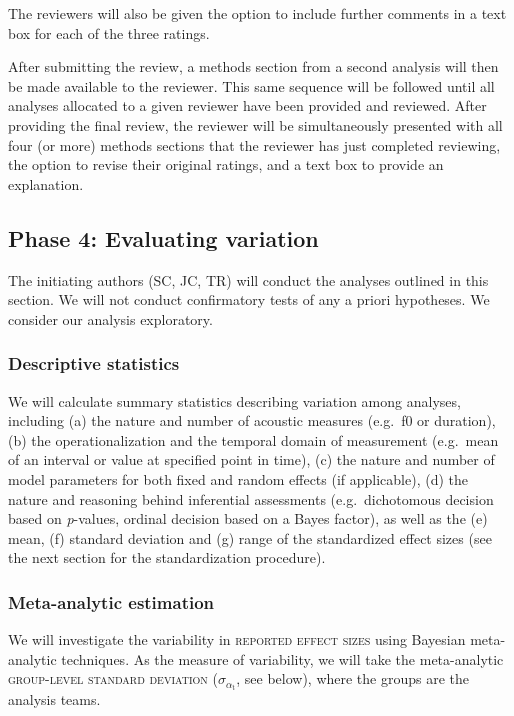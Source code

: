 \documentclass[Review,times,sageh]{sagej}
\begin{document}
The reviewers will also be given the option to include further comments in a text box for each of the three ratings.

After submitting the review, a methods section from a second analysis will then be made available to the reviewer.
This same sequence will be followed until all analyses allocated to a given reviewer have been provided and reviewed.
After providing the final review, the reviewer will be simultaneously presented with all four (or more) methods sections that the reviewer has just completed reviewing, the option to revise their original ratings, and a text box to provide an explanation.

\hypertarget{phase-4-evaluating-variation}{%
\subsection{Phase 4: Evaluating variation}\label{phase-4-evaluating-variation}}

The initiating authors (SC, JC, TR) will conduct the analyses outlined in this section.
We will not conduct confirmatory tests of any a priori hypotheses.
We consider our analysis exploratory.

\hypertarget{descriptive-statistics}{%
\subsubsection{Descriptive statistics}\label{descriptive-statistics}}

We will calculate summary statistics describing variation among analyses, including (a) the nature and number of acoustic measures (e.g.~f0 or duration), (b) the operationalization and the temporal domain of measurement (e.g.~mean of an interval or value at specified point in time), (c) the nature and number of model parameters for both fixed and random effects (if applicable), (d) the nature and reasoning behind inferential assessments (e.g.~dichotomous decision based on \emph{p}-values, ordinal decision based on a Bayes factor), as well as the (e) mean, (f) standard deviation and (g) range of the standardized effect sizes (see the next section for the standardization procedure).

\hypertarget{s:meta-est}{%
\subsubsection{Meta-analytic estimation}\label{s:meta-est}}

We will investigate the variability in \textsc{reported effect sizes} using Bayesian meta-analytic techniques.
As the measure of variability, we will take the meta-analytic \textsc{group-level standard deviation} (\(\sigma_{\alpha_{\text{t}}}\), see below), where the groups are the analysis teams.
\end{document}
